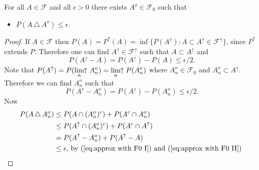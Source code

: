 \begin{theorem}
\label{approximating P with F0}
For all $A\in \mathcal F$ and all $\epsilon>0$ there exists $A^o\in\mathcal F_0$ such that
\begin{itemize}
\item $P(A\,\triangle\, A^o)\leq \epsilon$.
\end{itemize}
\end{theorem}
\begin{proof}
If $A\in \mathcal F$ then $P(A) = P^*(A) =  \inf\{P(A^\uparrow)\colon A\subset A^\uparrow \in \mathcal F^\uparrow  \}$, since $P^*$ extends $P$. Therefore one can find $A^\uparrow \in \mathcal F^\uparrow$ such that $A\subset A^\uparrow$ and
\begin{equation}
\label{eq:approx with F0 I}
P(A^\uparrow - A) =  P(A^\uparrow) -  P(A)   \leq \epsilon / 2.
\end{equation}
Note that  $P(A^\uparrow) = P(\displaystyle\lim_{n}\!\!\uparrow A_n^o) = \displaystyle\lim_{n}\!\!\uparrow P(A_n^o) $ where $A_n^o\in \mathcal F_0$ and $A_n^o\subset A^\uparrow$. Therefore we can find $A_n^o$ such that
\begin{equation}
\label{eq:approx with F0 II}
P(A^\uparrow -  A_n^o) =  P(A^\uparrow) -  P(A_n^o)   \leq \epsilon / 2.
\end{equation}
Now
\begin{align*}
P(A\,\triangle\, A_n^o)
&\leq P(A\cap (A_n^o)^c) + P(A^c \cap A_n^o)\\
&\leq P(A^\uparrow \cap (A_n^o)^c) + P(A^c \cap A^\uparrow)\\
&= P(A^\uparrow - A_n^o) + P(A^\uparrow - A)\\
&\leq \epsilon,\,\text{by (\ref{eq:approx with F0 I}) and (\ref{eq:approx with F0 II}) }
\end{align*}

\end{proof}



